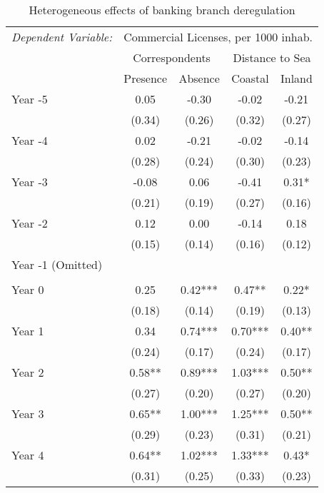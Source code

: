\begin{table}[H]

\caption{\label{tab:apptabhet}Heterogeneous effects of banking branch deregulation}
\centering
\begin{threeparttable}
\begin{tabular}[t]{lcccc}
\toprule
\multicolumn{1}{c}{\textit{Dependent Variable:}} & \multicolumn{4}{c}{Commercial Licenses, per 1000 inhab.} \\
\cmidrule(l{3pt}r{3pt}){1-1} \cmidrule(l{3pt}r{3pt}){2-5}
\multicolumn{1}{c}{ } & \multicolumn{2}{c}{Correspondents} & \multicolumn{2}{c}{Distance to Sea} \\
\cmidrule(l{3pt}r{3pt}){2-3} \cmidrule(l{3pt}r{3pt}){4-5}
\multicolumn{1}{c}{ } & \multicolumn{1}{c}{Presence} & \multicolumn{1}{c}{Absence} & \multicolumn{1}{c}{Coastal} & \multicolumn{1}{c}{Inland} \\
\cmidrule(l{3pt}r{3pt}){2-2} \cmidrule(l{3pt}r{3pt}){3-3} \cmidrule(l{3pt}r{3pt}){4-4} \cmidrule(l{3pt}r{3pt}){5-5}
Year -5 & 0.05 & -0.30 & -0.02 & -0.21\\
 & (0.34) & (0.26) & (0.32) & (0.27)\\
Year -4 & 0.02 & -0.21 & -0.02 & -0.14\\
 & (0.28) & (0.24) & (0.30) & (0.23)\\
Year -3 & -0.08 & 0.06 & -0.41 & 0.31*\\
 & (0.21) & (0.19) & (0.27) & (0.16)\\
Year -2 & 0.12 & 0.00 & -0.14 & 0.18\\
 & (0.15) & (0.14) & (0.16) & (0.12)\\
Year -1 (Omitted) &  &  &  & \\
 &  &  &  & \\
Year 0 & 0.25 & 0.42*** & 0.47** & 0.22*\\
 & (0.18) & (0.14) & (0.19) & (0.13)\\
Year 1 & 0.34 & 0.74*** & 0.70*** & 0.40**\\
 & (0.24) & (0.17) & (0.24) & (0.17)\\
Year 2 & 0.58** & 0.89*** & 1.03*** & 0.50**\\
 & (0.27) & (0.20) & (0.27) & (0.20)\\
Year 3 & 0.65** & 1.00*** & 1.25*** & 0.50**\\
 & (0.29) & (0.23) & (0.31) & (0.21)\\
Year 4 & 0.64** & 1.02*** & 1.33*** & 0.43*\\
 & (0.31) & (0.25) & (0.33) & (0.23)\\

\end{tabular}
\end{threeparttable}
\end{table}
